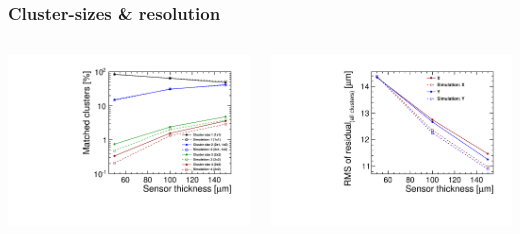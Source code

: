 \begin{frame}
  \frametitle{Cluster-sizes \& resolution}

  \begin{columns}
    \centering
    \includegraphics[width=\textwidth]{../figures/TestBeam/cluSize_vs_thickness.pdf}

    \centering
    \includegraphics[width=\textwidth]{../figures/TestBeam/residuals_vs_thickness.pdf}
  \end{columns}

\end{frame}
